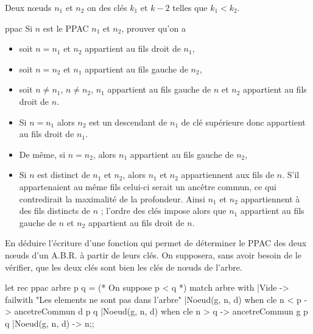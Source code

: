 Deux nœuds $n_1$ et $n_2$ on des clés $k_1$ et $k-2$ telles que $k_1 < k_2$.
\begin{question}{}{ppac}
 Si $n$ est le PPAC $n_1$ et $n_2$, prouver qu'on a 
\begin{itemize}
\item soit $n = n_1$ et $n_2$ appartient au fils droit de $n_1$,
\item soit $n = n_2$ et $n_1$ appartient au fils gauche de $n_2$,
\item soit $n\ne n_1$, $n\ne n_2$, $n_1$ appartient au fils gauche de $n$ et $n_2$ appartient au fils droit de $n$.
\end{itemize}
\reponse
\begin{itemize}
\item Si $n = n_1$ alors $n_2$ est un descendant de $n_1$ de clé supérieure donc appartient au fils droit de $n_1$.
\item De même, si $n = n_2$, alors $n_1$ appartient au fils gauche de $n_2$,
\item Si $n$ est distinct de $n_1$ et $n_2$, alors $n_1$ et $n_2$ appartiennent aux fils de $n$. S'il appartenaient au même fils celui-ci serait un ancêtre commun, ce qui contredirait la maximalité de la profondeur. Ainsi $n_1$ et $n_2$ appartiennent à des fils distincts de $n$ ; l'ordre des clés impose alors que $n_1$ appartient au fils gauche de $n$ et $n_2$ appartient au fils droit de $n$.
\end{itemize}
\end{question}
\begin{question}{}{}
En déduire l'écriture d'une fonction qui permet de déterminer le PPAC des deux nœuds d'un A.B.R. à partir de leurs clés. On supposera, sans avoir besoin de le vérifier, que les deux clés sont bien les clés de nœuds de l'arbre.
\reponse
\begin{ocaml}
let rec ppac arbre p q =
   (* On suppose p < q *)
    match arbre with
   |Vide -> failwith "Les elements ne sont pas dans l'arbre"
   |Noeud(g, n, d) when cle n < p -> ancetreCommun d p q
   |Noeud(g, n, d) when cle n > q -> ancetreCommun g p q
   |Noeud(g, n, d) -> n;;
\end{ocaml}
\end{question}
